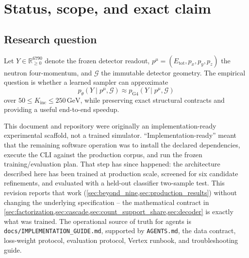 \documentclass[10pt,a4paper]{article}
\newcommand{\pFour}{p^{\mu}}
\newcommand{\Kinc}{K_{\mathrm{inc}}}
\newcommand{\Etot}{E_{\mathrm{tot}}}
\newcommand{\GeV}{\,\mathrm{GeV}}
\begin{document}
\tableofcontents
\newpage

\section{Status, scope, and exact claim}

\subsection{Research question}
Let $Y\in\mathbb{R}_{\ge 0}^{6790}$ denote the frozen detector readout, $\pFour=(\Etot,p_x,p_y,p_z)$ the neutron four-momentum, and $\mathcal G$ the immutable detector geometry. The empirical question is whether a learned sampler can approximate
\begin{equation}
 p_{\theta}(Y\mid \pFour,\mathcal G) \approx p_{\mathrm{G4}}(Y\mid \pFour,\mathcal G)
 \label{eq:target}
\end{equation}
over $50\le \Kinc\le250\GeV$, while preserving exact structural contracts and providing a useful end-to-end speedup.

This document and repository were originally an implementation-ready experimental scaffold, not a trained simulator. ``Implementation-ready'' meant that the remaining software operation was to install the declared dependencies, execute the CLI against the production corpus, and run the frozen training/evaluation plan. That step has since happened: the architecture described here has been trained at production scale, screened for six candidate refinements, and evaluated with a held-out classifier two-sample test. This revision reports that work (\cref{sec:beyond_nine,sec:production_results}) without changing the underlying specification -- the mathematical contract in \cref{sec:factorization,sec:cascade,sec:count_support_share,sec:decoder} is exactly what was trained. The operational source of truth for agents is \texttt{docs/IMPLEMENTATION\_GUIDE.md}, supported by \texttt{AGENTS.md}, the data contract, loss-weight protocol, evaluation protocol, Vertex runbook, and troubleshooting guide.
\end{document}
